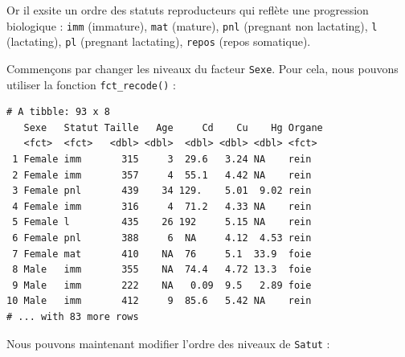 \documentclass[a4paperpaper,]{article}
\newenvironment{Shaded}{\begin{snugshade}}{\end{snugshade}}
\newcommand{\DataTypeTok}[1]{\textcolor[rgb]{0.00,0.34,0.68}{#1}}
\newcommand{\KeywordTok}[1]{\textcolor[rgb]{0.12,0.11,0.11}{\textbf{#1}}}
\newcommand{\NormalTok}[1]{\textcolor[rgb]{0.12,0.11,0.11}{#1}}
\newcommand{\OperatorTok}[1]{\textcolor[rgb]{0.12,0.11,0.11}{#1}}
\newcommand{\StringTok}[1]{\textcolor[rgb]{0.75,0.01,0.01}{#1}}
\theoremstyle{definition}
\theoremstyle{definition}
\theoremstyle{definition}
\theoremstyle{remark}
\begin{document}
Or il exsite un ordre des statuts reproducteurs qui reflète une
progression biologique : \texttt{imm} (immature), \texttt{mat} (mature),
\texttt{pnl} (pregnant non lactating), \texttt{l} (lactating),
\texttt{pl} (pregnant lactating), \texttt{repos} (repos somatique).

Commençons par changer les niveaux du facteur \texttt{Sexe}. Pour cela,
nous pouvons utiliser la fonction \texttt{fct\_recode()} :

\begin{Shaded}
\end{Shaded}

\begin{verbatim}
# A tibble: 93 x 8
   Sexe   Statut Taille   Age     Cd    Cu    Hg Organe
   <fct>  <fct>   <dbl> <dbl>  <dbl> <dbl> <dbl> <fct> 
 1 Female imm       315     3  29.6   3.24 NA    rein  
 2 Female imm       357     4  55.1   4.42 NA    rein  
 3 Female pnl       439    34 129.    5.01  9.02 rein  
 4 Female imm       316     4  71.2   4.33 NA    rein  
 5 Female l         435    26 192     5.15 NA    rein  
 6 Female pnl       388     6  NA     4.12  4.53 rein  
 7 Female mat       410    NA  76     5.1  33.9  foie  
 8 Male   imm       355    NA  74.4   4.72 13.3  foie  
 9 Male   imm       222    NA   0.09  9.5   2.89 foie  
10 Male   imm       412     9  85.6   5.42 NA    rein  
# ... with 83 more rows
\end{verbatim}

Nous pouvons maintenant modifier l'ordre des niveaux de \texttt{Satut} :

\begin{Shaded}
\end{Shaded}
\end{document}
